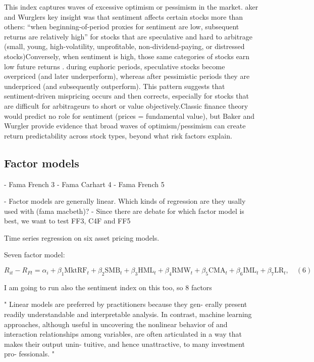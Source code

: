This index captures waves of excessive optimism or pessimism in the market. aker and Wurglers key insight was that sentiment affects certain stocks more than others: “when beginning-of-period proxies for sentiment are low, subsequent returns are relatively high” for stocks that are speculative and hard to arbitrage (small, young, high-volatility, unprofitable, non-dividend-paying, or distressed stocks)Conversely, when sentiment is high, those same categories of stocks earn low future returns . during euphoric periods, speculative stocks become overpriced (and later underperform), whereas after pessimistic periods they are underpriced (and subsequently outperform). This pattern suggests that sentiment-driven mispricing occurs and then corrects, especially for stocks that are difficult for arbitrageurs to short or value objectively.Classic finance theory would predict no role for sentiment (prices = fundamental value), but Baker and Wurgler provide evidence that broad waves of optimism/pessimism can create return predictability across stock types, beyond what risk factors explain.


\subsection{Factor models}
- Fama French 3
- Fama Carhart 4
- Fama French 5

- Factor models are generally linear. Which kinds of regression are they usally used with (fama macbeth)? 
- Since there are debate for which factor model is best, we want to test FF3, C4F and FF5

Time series regression on six asset pricing models.

Seven factor model:

\[
R_{it} - R_{Ft} = \alpha_i + \beta_1 \text{MktRF}_t + \beta_2 \text{SMB}_t + \beta_3 \text{HML}_t + \beta_4 \text{RMW}_t + \beta_5 \text{CMA}_t + \beta_6 \text{IML}_t + \beta_7 \text{LR}_t, \quad (6)
\]

I am going to run also the sentiment index on this too, so 8 factors

" Linear
models are preferred by practitioners because they gen-
erally present readily understandable and interpretable
analysis. In contrast, machine learning approaches,
although useful in uncovering the nonlinear behavior
of and interaction relationships among variables, are
often articulated in a way that makes their output unin-
tuitive, and hence unattractive, to many investment pro-
fessionals. "

